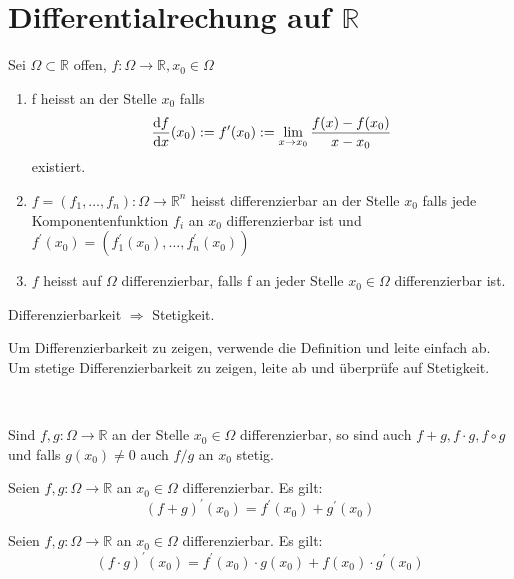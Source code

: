 \section{Differentialrechung auf $\mathbb{R}$}
	\begin{definition}[Diffenenzierbarkeit] 
		Sei $\Omega \subset \mathbb{R}$ offen, $f: \Omega \to \mathbb{R}, x_0 \in \Omega$
		\begin{enumerate}
			\item f heisst  an der Stelle $x_0$ falls 
			$$ \diff{f}{x}(x_0) := f^\prime (x_0) := \lim\limits_{x \to x_0} \frac{f(x)- f(x_0)}{x- x_0}$$ 
			existiert.
			\item $f = (f_1, \dots, f_n): \Omega \to \mathbb{R}^n$ heisst differenzierbar an der Stelle $x_0$ falls jede Komponentenfunktion $f_i$ an $x_0$ differenzierbar ist und $f^\prime(x_0) = (f_1^\prime(x_0), \dots , f_n^\prime(x_0))$
			\item $f$ heisst auf $\Omega$ differenzierbar, falls f an jeder Stelle $x_0 \in \Omega$ differenzierbar ist.
		\end{enumerate}
	\end{definition}
	\begin{proofhelp}
		Differenzierbarkeit $\Rightarrow$ Stetigkeit.
	\end{proofhelp}
	\begin{hint}
		Um Differenzierbarkeit zu zeigen, verwende die Definition und leite  einfach ab. \\
		Um stetige Differenzierbarkeit zu zeigen, leite ab und überprüfe auf Stetigkeit.
	\end{hint}
	\\[1em]
	\begin{theorem}[Rechenregeln]
		Sind $f,g: \Omega \to \mathbb{R}$ an der Stelle $x_0 \in \Omega$ differenzierbar, so sind auch $f + g, f \cdot g, f \circ g$ und falls $g(x_0) \neq 0$ auch $f/g$ an $x_0$ stetig.
	\end{theorem}
	\begin{theorem}[Summenregel]
		Seien $f,g: \Omega \to \mathbb{R}$ an $x_0 \in \Omega$ differenzierbar. Es gilt:
		$$ (f + g)^\prime(x_0) = f^\prime(x_0) + g^\prime(x_0) $$
	\end{theorem}
	\begin{theorem}[Produktregel]
		Seien $f,g: \Omega \to \mathbb{R}$ an $x_0 \in \Omega$ differenzierbar. Es gilt:
		$$ (f \cdot g)^\prime(x_0) = f^\prime(x_0) \cdot g(x_0) + f(x_0) \cdot g^\prime(x_0) $$
	\end{theorem}
